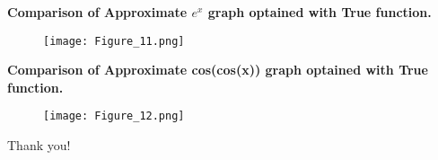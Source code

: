 \documentclass[12pt]{article}
\begin{document}
\textbf{Comparison of Approximate $e^x$ graph optained with True function.}\\

\begin{figure}[h!]
\centering
\texttt{[image: Figure\_11.png]}
\label{fig:exemplo}
\end{figure}

\textbf{Comparison of Approximate cos(cos(x)) graph optained with True function.}\\


\begin{figure}[h!]
\centering
\texttt{[image: Figure\_12.png]}
\label{fig:exemplo}
\end{figure}
\begin{center} 
Thank you!
\end{center} 
\end{document}
